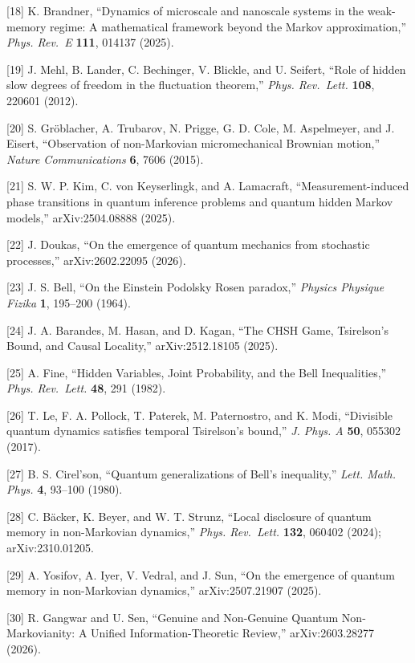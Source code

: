 \documentclass[
]{article}
\begin{document}
{[}18{]} K. Brandner, ``Dynamics of microscale and nanoscale systems in
the weak-memory regime: A mathematical framework beyond the Markov
approximation,'' \emph{Phys. Rev.~E} \textbf{111}, 014137 (2025).

{[}19{]} J. Mehl, B. Lander, C. Bechinger, V. Blickle, and U. Seifert,
``Role of hidden slow degrees of freedom in the fluctuation theorem,''
\emph{Phys. Rev.~Lett.} \textbf{108}, 220601 (2012).

{[}20{]} S. Gröblacher, A. Trubarov, N. Prigge, G. D. Cole, M.
Aspelmeyer, and J. Eisert, ``Observation of non-Markovian
micromechanical Brownian motion,'' \emph{Nature Communications}
\textbf{6}, 7606 (2015).

{[}21{]} S. W. P. Kim, C. von Keyserlingk, and A. Lamacraft,
``Measurement-induced phase transitions in quantum inference problems
and quantum hidden Markov models,'' arXiv:2504.08888 (2025).

{[}22{]} J. Doukas, ``On the emergence of quantum mechanics from
stochastic processes,'' arXiv:2602.22095 (2026).

{[}23{]} J. S. Bell, ``On the Einstein Podolsky Rosen paradox,''
\emph{Physics Physique Fizika} \textbf{1}, 195--200 (1964).

{[}24{]} J. A. Barandes, M. Hasan, and D. Kagan, ``The CHSH Game,
Tsirelson's Bound, and Causal Locality,'' arXiv:2512.18105 (2025).

{[}25{]} A. Fine, ``Hidden Variables, Joint Probability, and the Bell
Inequalities,'' \emph{Phys. Rev.~Lett.} \textbf{48}, 291 (1982).

{[}26{]} T. Le, F. A. Pollock, T. Paterek, M. Paternostro, and K. Modi,
``Divisible quantum dynamics satisfies temporal Tsirelson's bound,''
\emph{J. Phys. A} \textbf{50}, 055302 (2017).

{[}27{]} B. S. Cirel'son, ``Quantum generalizations of Bell's
inequality,'' \emph{Lett. Math. Phys.} \textbf{4}, 93--100 (1980).

{[}28{]} C. Bäcker, K. Beyer, and W. T. Strunz, ``Local disclosure of
quantum memory in non-Markovian dynamics,'' \emph{Phys. Rev.~Lett.}
\textbf{132}, 060402 (2024); arXiv:2310.01205.

{[}29{]} A. Yosifov, A. Iyer, V. Vedral, and J. Sun, ``On the emergence
of quantum memory in non-Markovian dynamics,'' arXiv:2507.21907 (2025).

{[}30{]} R. Gangwar and U. Sen, ``Genuine and Non-Genuine Quantum
Non-Markovianity: A Unified Information-Theoretic Review,''
arXiv:2603.28277 (2026).
\end{document}
